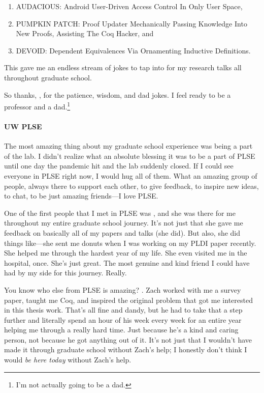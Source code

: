 \begin{enumerate}
\item \textsc{AUDACIOUS}: Android User-Driven Access Control In Only User Space,
\item \textsc{PUMPKIN PATCH}: Proof Updater Mechanically Passing Knowledge Into New Proofs, Assisting The Coq Hacker, and
\item \textsc{DEVOID}: Dependent Equivalences Via Ornamenting Inductive Definitions.
\end{enumerate}
This gave me an endless stream of jokes to tap into for my research talks all throughout graduate school.

So thanks, , for the patience, wisdom, and dad jokes. I feel ready to be a professor and a dad.\footnote{I'm not actually going to be a dad.}

\paragraph{UW PLSE}
The most amazing thing about my graduate school experience was being a part of the  lab.
I didn't realize what an absolute blessing it was to be a part of PLSE until one day the pandemic hit and the lab suddenly closed.
If I could see everyone in PLSE right now, I would hug all of them.
What an amazing group of people, always there to support each other,
to give feedback, to inspire new ideas, to chat,
to be just amazing friends---I love PLSE.

One of the first people that I met in PLSE was , and she was there for me throughout my entire graduate school journey.
It's not just that she gave me feedback on basically all of my papers and talks (she did).
But also, she did things like---she sent me donuts when I was working on my PLDI paper recently.
She helped me through the hardest year of my life.
She even visited me in the hospital, once.
She's just great.
The most genuine and kind friend I could have had by my side for this journey. Really.

You know who else from PLSE is amazing? .
Zach worked with me a survey paper, taught me Coq, and inspired the original problem that got me interested in this thesis work.
That's all fine and dandy, but he had to take that a step further and literally spend an hour of his week every week
for an entire year helping me through a really hard time.
Just because he's a kind and caring person, not because he got anything out of it.
It's not just that I wouldn't have made it through graduate school without Zach's help;
I honestly don't think I would \textit{be here today} without Zach's help.

